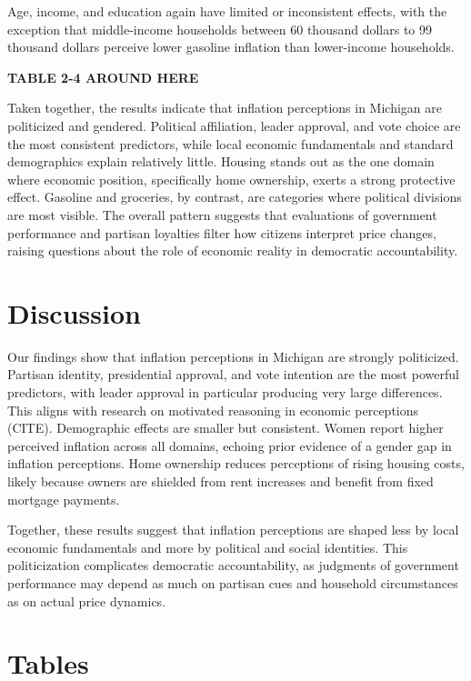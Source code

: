 \documentclass[preprint,12pt,authoryear]{elsarticle}
\begin{document}
Age, income, and education again have limited or inconsistent effects, with the exception that middle-income households between 60 thousand dollars to 99 thousand dollars perceive lower gasoline inflation than lower-income households. 

\begin{center}
\textbf{TABLE 2-4 AROUND HERE}
\end{center}

Taken together, the results indicate that inflation perceptions in Michigan are politicized and gendered. Political affiliation, leader approval, and vote choice are the most consistent predictors, while local economic fundamentals and standard demographics explain relatively little. Housing stands out as the one domain where economic position, specifically home ownership, exerts a strong protective effect. Gasoline and groceries, by contrast, are categories where political divisions are most visible. The overall pattern suggests that evaluations of government performance and partisan loyalties filter how citizens interpret price changes, raising questions about the role of economic reality in democratic accountability.  



\section{Discussion}
Our findings show that inflation perceptions in Michigan are strongly politicized. Partisan identity, presidential approval, and vote intention are the most powerful predictors, with leader approval in particular producing very large differences. This aligns with research on motivated reasoning in economic perceptions (CITE). Demographic effects are smaller but consistent. Women report higher perceived inflation across all domains, echoing prior evidence of a gender gap in inflation perceptions. Home ownership reduces perceptions of rising housing costs, likely because owners are shielded from rent increases and benefit from fixed mortgage payments.

Together, these results suggest that inflation perceptions are shaped less by local economic fundamentals and more by political and social identities. This politicization complicates democratic accountability, as judgments of government performance may depend as much on partisan cues and household circumstances as on actual price dynamics.


\clearpage
{}
\section*{Tables}
\label{sec:tables}

\end{document}
